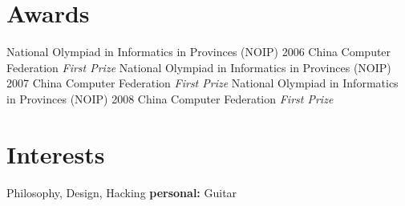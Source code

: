 \documentclass[]{friggeri-cv} %
\begin{document}

\section{Awards}

\begin{entrylist}
  {National Olympiad in Informatics in Provinces (NOIP) 2006}
  {China Computer Federation}
  {\emph{First Prize}}
  {National Olympiad in Informatics in Provinces (NOIP) 2007}
  {China Computer Federation}
  {\emph{First Prize}}
  {National Olympiad in Informatics in Provinces (NOIP) 2008}
  {China Computer Federation}
  {\emph{First Prize}}
\end{entrylist}


\section{Interests}

Philosophy, Design, Hacking
\textbf{personal:} Guitar
\end{document}
